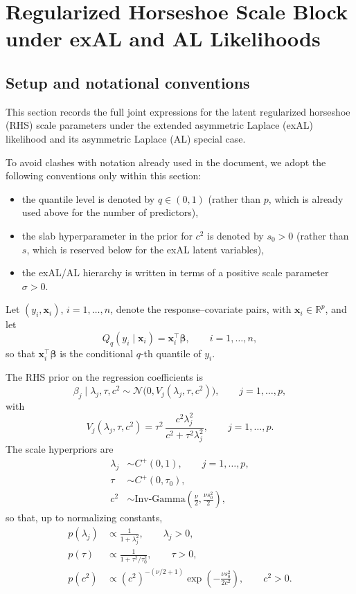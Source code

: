 \documentclass[11pt]{article}
\newcommand{\vect}[1]{\boldsymbol{#1}}
\newcommand{\R}{\mathbb{R}}
\newcommand{\IG}{\mathrm{Inv\text{-}Gamma}}
\newcommand{\N}{\mathcal{N}}
\begin{document}
\section{Regularized Horseshoe Scale Block under exAL and AL Likelihoods}

\subsection{Setup and notational conventions}

This section records the full joint expressions for the latent regularized horseshoe (RHS)
scale parameters under the extended asymmetric Laplace (exAL) likelihood and its
asymmetric Laplace (AL) special case.

To avoid clashes with notation already used in the document, we adopt the following
conventions only within this section:
\begin{itemize}
  \item the quantile level is denoted by $q \in (0,1)$ (rather than $p$, which is already used above for the number of predictors),
  \item the slab hyperparameter in the prior for $c^2$ is denoted by $s_0>0$ (rather than $s$, which is reserved below for the exAL latent variables),
  \item the exAL/AL hierarchy is written in terms of a positive scale parameter $\sigma>0$.
\end{itemize}

Let $(y_i,\vect{x}_i)$, $i=1,\dots,n$, denote the response--covariate pairs, with
$\vect{x}_i \in \R^p$, and let
\begin{equation}
  Q_q(y_i \mid \vect{x}_i) = \vect{x}_i^\top \vect{\beta},
  \qquad i=1,\dots,n,
\end{equation}
so that $\vect{x}_i^\top \vect{\beta}$ is the conditional $q$-th quantile of $y_i$.

The RHS prior on the regression coefficients is
\begin{equation}
  \beta_j \mid \lambda_j,\tau,c^2
  \sim \N\!\big(0, V_j(\lambda_j,\tau,c^2)\big),
  \qquad j=1,\dots,p,
\end{equation}
with
\begin{equation}
  V_j(\lambda_j,\tau,c^2)
  =
  \tau^2 \,\frac{c^2 \lambda_j^2}{c^2 + \tau^2 \lambda_j^2},
  \qquad j=1,\dots,p.
\end{equation}
The scale hyperpriors are
\begin{align}
  \lambda_j &\sim C^+(0,1), \qquad j=1,\dots,p,\\
  \tau &\sim C^+(0,\tau_0),\\
  c^2 &\sim \IG\!\left(\frac{\nu}{2}, \frac{\nu s_0^2}{2}\right),
\end{align}
so that, up to normalizing constants,
\begin{align}
  p(\lambda_j) &\propto \frac{1}{1+\lambda_j^2}, \qquad \lambda_j>0,\\
  p(\tau) &\propto \frac{1}{1+\tau^2/\tau_0^2}, \qquad \tau>0,\\
  p(c^2) &\propto (c^2)^{-(\nu/2+1)}
  \exp\!\left(-\frac{\nu s_0^2}{2c^2}\right), \qquad c^2>0.
\end{align}
\end{document}
